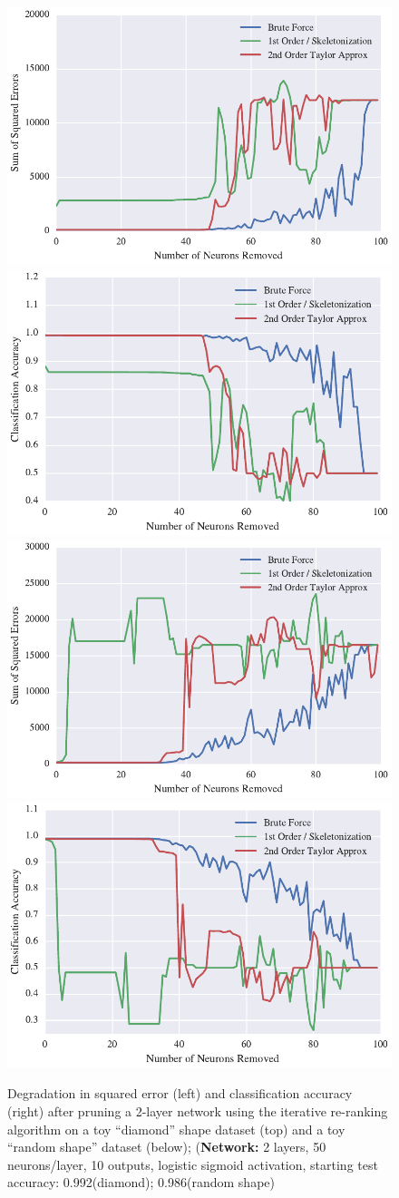 \begin{figure}[!ht]
\centering
\includegraphics[width=0.49\linewidth]{png/diamond-iterative-rerank-method.pdf}
\includegraphics[width=0.49\linewidth]{png/diamond-iterative-rerank-accuracy.pdf}
\includegraphics[width=0.49\linewidth]{png/rshape-iterative-rerank-method.pdf}
\includegraphics[width=0.49\linewidth]{png/rshape-iterative-rerank-accuracy.pdf}
\caption{Degradation in squared error (left) and classification accuracy (right) after pruning a 2-layer network using the iterative re-ranking algorithm on a toy ``diamond'' shape dataset (top) and a toy ``random shape'' dataset (below); (\textbf{Network:} 2 layers, 50 neurons/layer, 10 outputs, logistic sigmoid activation, starting test accuracy: 0.992(diamond); 0.986(random shape)}
\label{fig:diamond}
\end{figure}

